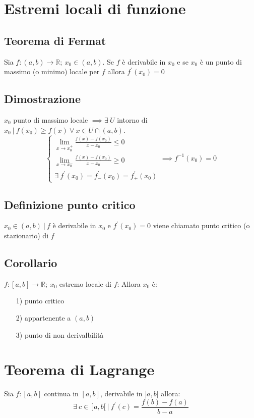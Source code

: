 \section{Estremi locali di funzione}
\subsection{Teorema di Fermat}
Sia $f: (a,b) \to \mathbb{R};\ x_0 \in (a,b)$. Se $f$ è derivabile in $x_0$ e se $x_0$ è un punto di massimo (o minimo) locale per $f$ allora $f^{\prime}(x_0) = 0$
\subsection{Dimostrazione}
$x_0$ punto di massimo locale $\implies \exists\ U$ intorno di $x_0\ |\ f(x_0) \geq f(x)\ \forall\ x \in U \cap (a,b)$.
\begin{equation} 
\begin{cases}
\displaystyle \lim_{x \to x_0^+}\frac{f(x) - f(x_0)}{x - x_0} \leq 0\\
\displaystyle \lim_{x \to x_0^-}\frac{f(x) - f(x_0)}{x - x_0} \geq 0\\
\exists\ f^{\prime}(x_0) = f^{\prime}_-(x_0) = f^{\prime}_+(x_0)
\end{cases}
\implies f^{-1}(x_0) = 0
\end{equation}
\subsection{Definizione punto critico}
$x_0 \in (a,b)\ |\ f$ è derivabile in $x_0$ e $f^{\prime}(x_0) = 0$ viene chiamato punto critico (o stazionario) di $f$
\subsection{Corollario}
$f: [a,b] \to \mathbb{R};\ x_0$ estremo locale di $f$: Allora $x_0$ è:
\begin{enumerate}
\item[1)] punto critico
\item[2)] appartenente a $(a,b)$
\item[3)] punto di non derivalbilità
\end{enumerate} 

\section{Teorema di Lagrange}
Sia $f: [a,b]$ continua in $[a,b]$, derivabile in $]a,b[$ allora:
\begin{equation}
\exists\ c \in\ ]a,b[\ |\ f^{\prime}(c) = \frac{f(b) - f(a)}{b - a}
\end{equation}

